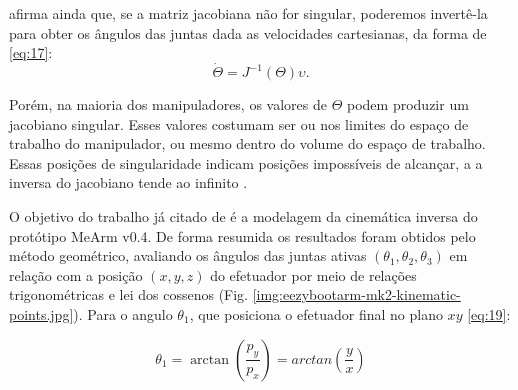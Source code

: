  afirma ainda que, se a matriz jacobiana não for singular, poderemos invertê-la para obter os ângulos das juntas dada as velocidades cartesianas, da forma de \eqref{eq:17}:
\begin{equation}
	\dot\Theta = J^{-1}(\Theta) \upsilon.
	\label{eq:17}
\end{equation}

Porém, na maioria dos manipuladores, os valores de $\Theta$ podem produzir um jacobiano singular. Esses valores costumam ser ou nos limites do espaço de trabalho do manipulador, ou mesmo dentro do volume do espaço de trabalho. Essas posições de singularidade indicam posições impossíveis de alcançar, a a inversa do jacobiano tende ao infinito \cite{Craig2005}.
%
%
%

O objetivo do trabalho já citado de \cite{costa2017} é a modelagem da cinemática inversa do protótipo MeArm v0.4. De forma resumida os resultados foram obtidos pelo método geométrico, avaliando os ângulos das juntas ativas $(\theta_1,\theta_2, \theta_3)$  em relação com a posição $(x, y, z)$ do efetuador por meio de relações trigonométricas e lei dos cossenos (Fig. \ref{img:eezybootarm-mk2-kinematic-points.jpg}).  Para o angulo $\theta_1$, que posiciona o efetuador final no plano $xy$ \eqref{eq:19}:


\begin{equation}
	\theta_1 = \arctan \left (\frac{p_y}{p_x}\right ) = arctan \left ( \frac{y}{x} \right )
	\label{eq:19}
\end{equation}


